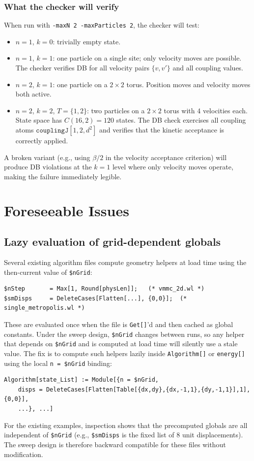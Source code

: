\documentclass[12pt,a4paper]{article}
\begin{document}
\subsubsection*{What the checker will verify}

When run with \texttt{-maxN 2 -maxParticles 2}, the checker will test:
\begin{itemize}
  \item $n=1$, $k=0$: trivially empty state.
  \item $n=1$, $k=1$: one particle on a single site; only velocity moves are
    possible.  The checker verifies DB for all velocity pairs $\{v, v'\}$ and
    all coupling values.
  \item $n=2$, $k=1$: one particle on a $2\times2$ torus.  Position moves and
    velocity moves both active.
  \item $n=2$, $k=2$, $T=\{1,2\}$: two particles on a $2\times2$ torus with 4
    velocities each.  State space has $C(16, 2) = 120$ states.  The DB check
    exercises all coupling atoms $\texttt{couplingJ}[1, 2, d^2]$ and verifies
    that the kinetic acceptance is correctly applied.
\end{itemize}

A broken variant (e.g., using $\beta/2$ in the velocity acceptance criterion)
will produce DB violations at the $k=1$ level where only velocity moves
operate, making the failure immediately legible.

\section{Foreseeable Issues}
\label{sec:issues}

\subsection{Lazy evaluation of grid-dependent globals}
Several existing algorithm files compute geometry helpers at load time using
the then-current value of \texttt{\$nGrid}:
\begin{lstlisting}
$nStep       = Max[1, Round[physLen]];   (* vmmc_2d.wl *)
$smDisps     = DeleteCases[Flatten[...], {0,0}];  (* single_metropolis.wl *)
\end{lstlisting}
These are evaluated once when the file is \texttt{Get[]}'d and then cached as
global constants.  Under the sweep design, \texttt{\$nGrid} changes between
runs, so any helper that depends on \texttt{\$nGrid} and is computed at load
time will silently use a stale value.  The fix is to compute such helpers
lazily inside \texttt{Algorithm[]} or \texttt{energy[]} using the local
\texttt{n = \$nGrid} binding:
\begin{lstlisting}
Algorithm[state_List] := Module[{n = $nGrid,
    disps = DeleteCases[Flatten[Table[{dx,dy},{dx,-1,1},{dy,-1,1}],1],{0,0}],
    ...}, ...]
\end{lstlisting}
For the existing examples, inspection shows that the precomputed globals are
all independent of \texttt{\$nGrid} (e.g., \texttt{\$smDisps} is the fixed
list of 8 unit displacements).  The sweep design is therefore backward
compatible for these files without modification.
\end{document}
